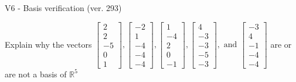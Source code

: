 \begin{exercise}
  \begin{exerciseTitle}V6 - Basis verification (ver. 293)\end{exerciseTitle}
  \begin{exerciseStatement}
    Explain why the vectors \(\left[\begin{array}{r}
2 \\
2 \\
-5 \\
0 \\
1
\end{array}\right] , \left[\begin{array}{r}
-2 \\
1 \\
-4 \\
-4 \\
-4
\end{array}\right] , \left[\begin{array}{r}
1 \\
-4 \\
2 \\
0 \\
-1
\end{array}\right] , \left[\begin{array}{r}
4 \\
-3 \\
-3 \\
-5 \\
-3
\end{array}\right] , \text{ and } \left[\begin{array}{r}
-3 \\
4 \\
-1 \\
-4 \\
-4
\end{array}\right]\) are or are not a basis of \(\mathbb{R}^5\)	



\end{exerciseStatement}
\end{exercise}
